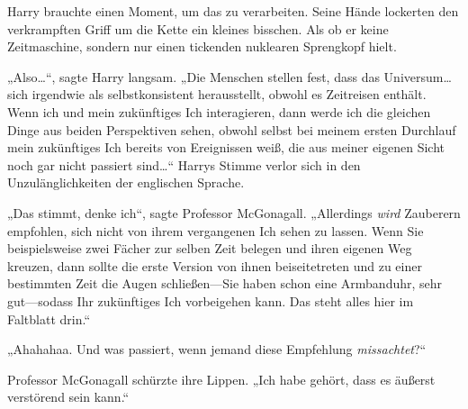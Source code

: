Harry brauchte einen Moment, um das zu verarbeiten. Seine Hände lockerten den verkrampften Griff um die Kette ein kleines bisschen. Als ob er keine Zeitmaschine, sondern nur einen tickenden nuklearen Sprengkopf hielt.

„Also…“, sagte Harry langsam. „Die Menschen stellen fest, dass das Universum…sich irgendwie als selbstkonsistent herausstellt, obwohl es Zeitreisen enthält. Wenn ich und mein zukünftiges Ich interagieren, dann werde ich die gleichen Dinge aus beiden Perspektiven sehen, obwohl selbst bei meinem ersten Durchlauf mein zukünftiges Ich bereits von Ereignissen weiß, die aus meiner eigenen Sicht noch gar nicht passiert sind…“ Harrys Stimme verlor sich in den Unzulänglichkeiten der englischen Sprache.

„Das stimmt, denke ich“, sagte Professor McGonagall. „Allerdings \emph{wird} Zauberern empfohlen, sich nicht von ihrem vergangenen Ich sehen zu lassen. Wenn Sie beispielsweise zwei Fächer zur selben Zeit belegen und ihren eigenen Weg kreuzen, dann sollte die erste Version von ihnen beiseitetreten und zu einer bestimmten Zeit die Augen schließen—Sie haben schon eine Armbanduhr, sehr gut—sodass Ihr zukünftiges Ich vorbeigehen kann. Das steht alles hier im Faltblatt drin.“

„Ahahahaa. Und was passiert, wenn jemand diese Empfehlung \emph{missachtet}?“

Professor McGonagall schürzte ihre Lippen. „Ich habe gehört, dass es äußerst verstörend sein kann.“

